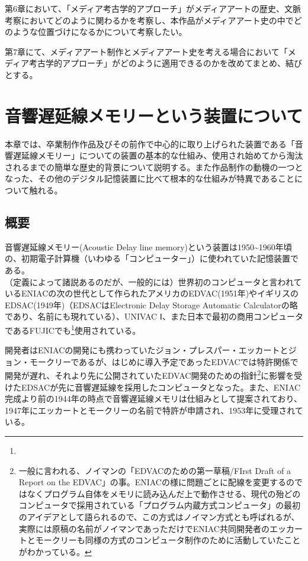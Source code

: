 第6章において、「メディア考古学的アプローチ」がメディアアートの歴史、文脈考察においてどのように関わるかを考察し、本作品がメディアアート史の中でどのような位置づけになるかについて考察したい。

第7章にて、メディアアート制作とメディアアート史を考える場合において「メディア考古学的アプローチ」がどのように適用できるのかを改めてまとめ、結びとする。

\chapter{音響遅延線メモリーという装置について}\label{ux97f3ux97ffux9045ux5ef6ux7ddaux30e1ux30e2ux30eaux30fcux3068ux3044ux3046ux88c5ux7f6eux306bux3064ux3044ux3066}

本章では、卒業制作作品及びその前作で中心的に取り上げられた装置である「音響遅延線メモリー」についての装置の基本的な仕組み、使用され始めてから淘汰されるまでの簡単な歴史的背景について説明する。また作品制作の動機の一つとなった、その他のデジタル記憶装置に比べて根本的な仕組みが特異であることについて触れる。

\section{概要}\label{ux6982ux8981}

音響遅延線メモリー(Acoustic Delay line
memory)という装置は1950\textasciitilde{}1960年頃の、初期電子計算機（いわゆる「コンピューター」）に使われていた記憶装置である。\\
（定義によって諸説あるのだが、一般的には）世界初のコンピュータと言われているENIACの次の世代として作られたアメリカのEDVAC(1951年)やイギリスのEDSAC(1949年)（EDSACはElectronic
Delay Storage Automatic
Calculatorの略であり、名前にも現れている）、UNIVAC
Ⅰ、また日本で最初の商用コンピュータであるFUJICでも\footnote{}使用されている。

開発者はENIACの開発にも携わっていたジョン・プレスパー・エッカートとジョン・モークリーであるが、はじめに導入予定であったEDVACでは特許関係で開発が遅れ、それより先に公開されていたEDVAC開発のための指針\footnote{一般に言われる、ノイマンの「EDVACのための第一草稿/FIrst
  Draft of a Report on the
  EDVAC」の事。ENIACの様に問題ごとに配線を変更するのではなくプログラム自体をメモリに読み込んだ上で動作させる、現代の殆どのコンピュータで採用されている「プログラム内蔵方式コンピュータ」の最初のアイデアとして語られるので、この方式はノイマン方式とも呼ばれるが、実際には原稿の名前がノイマンであっただけでENIAC共同開発者のエッカートとモークリーも同様の方式のコンピュータ制作のために活動していたことがわかっている。}に影響を受けたEDSACが先に音響遅延線を採用したコンピュータとなった。また、ENIAC完成より前の1944年の時点で音響遅延線メモリは仕組みとして提案されており、1947年にエッカートとモークリーの名前で特許が申請され、1953年に受理されている\autocite{eckert1953memory}。

